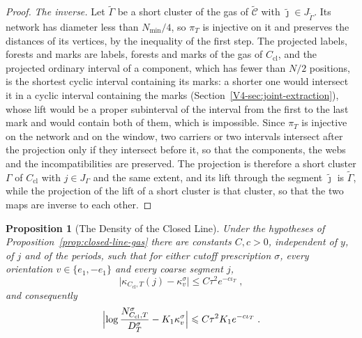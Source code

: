 \documentclass[11pt]{article}
\numberwithin{equation}{section}
\newtheorem{proposition}[theorem]{Proposition}
\theoremstyle{remark}
\theoremstyle{plain}
\begin{document}
\begin{proof}
\emph{The inverse.} Let $\widetilde\Gamma$ be a short cluster of the gas of $\widetilde{\mathcal C}$ with $\tilde\jmath\in J_{\widetilde\Gamma}$. Its network has diameter less than $N_{\min}/4$, so $\pi_T$ is injective on it and preserves the distances of its vertices, by the inequality of the first step. The projected labels, forests and marks are labels, forests and marks of the gas of $C_{\mathrm{cl}}$, and the projected ordinary interval of a component, which has fewer than $N/2$ positions, is the shortest cyclic interval containing its marks: a shorter one would intersect it in a cyclic interval containing the marks (Section~\ref{V4-sec:joint-extraction}), whose lift would be a proper subinterval of the interval from the first to the last mark and would contain both of them, which is impossible. Since $\pi_T$ is injective on the network and on the window, two carriers or two intervals intersect after the projection only if they intersect before it, so that the components, the webs and the incompatibilities are preserved. The projection is therefore a short cluster $\Gamma$ of $C_{\mathrm{cl}}$ with $j\in J_{\Gamma}$ and the same extent, and its lift through the segment $\tilde\jmath$ is $\widetilde\Gamma$, while the projection of the lift of a short cluster is that cluster, so that the two maps are inverse to each other.
\end{proof}

\begin{proposition}[The Density of the Closed Line]\label{prop:closed-line-density}
Under the hypotheses of Proposition~\ref{prop:closed-line-gas} there are constants $C,c>0$, independent of $y$, of $j$ and of the periods, such that for either cutoff prescription $\sigma$, every orientation $v\in\{ e_1,-e_1\}$ and every coarse segment $j$,
\begin{equation}\label{eq:closed-line-density}
    \bigl|\kappa_{C_{\mathrm{cl}},T}(j)-\kappa^{\sigma}_v\bigr|\leqslant C\tau^2e^{-c\iota_T}\;,
\end{equation}
and consequently
\begin{equation}\label{eq:closed-line-flat}
    \Bigl|\log\frac{N^{\sigma}_{C_{\mathrm{cl}},T}}{D^{\sigma}_T}-K_1\kappa^{\sigma}_v\Bigr|\leqslant C\tau^2K_1e^{-c\iota_T}\;.
\end{equation}
\end{proposition}
\end{document}

